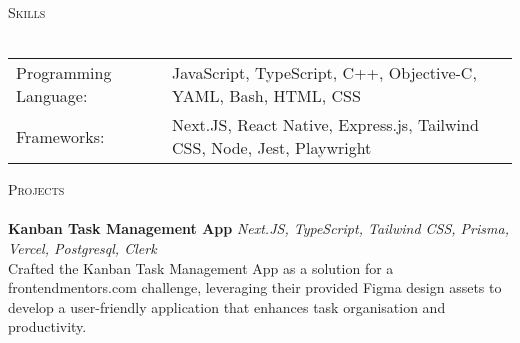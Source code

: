 \documentclass[a4paper]{article}
\newcommand{\lineunder} {
    \vspace*{-8pt} \\
    \hspace*{-18pt} \hrulefill \\
}
\newcommand{\header} [1] {
    {\hspace*{-18pt}\vspace*{6pt} \textsc{#1}}
    \vspace*{-6pt} \lineunder
}
\begin{document}
\header{Skills}
\begin{tabular}{V{5cm} @{\hskip 0.6cm} V{12cm}}
Programming Language: & JavaScript, TypeScript, C++, Objective-C, YAML, Bash, HTML, CSS \\
Frameworks: & Next.JS, React Native, Express.js, Tailwind CSS, Node, Jest, Playwright \\
\end{tabular}
\vspace{2mm}

\header{Projects}
      {\textbf{Kanban Task Management App}} {\sl Next.JS, TypeScript, Tailwind CSS, Prisma, Vercel, Postgresql, Clerk} \\
Crafted the Kanban Task Management App as a solution for a frontendmentors.com challenge, leveraging their provided Figma design assets to develop a user-friendly application that enhances task organisation and productivity.\\
\vspace*{2mm}

    
\end{document}

